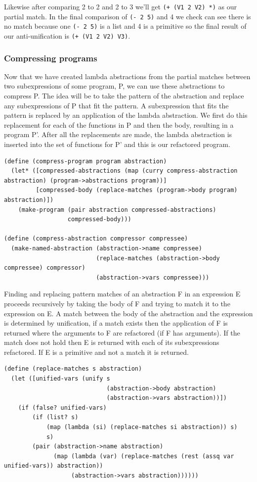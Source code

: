 \documentclass[a4paper,10pt]{article}
\begin{document}
Likewise after comparing 2 to 2 and 2 to 3 we'll get \texttt{(+ (V1 2 V2) *)} as our partial match.
In the final comparison of \texttt{(- 2 5)} and 4 we check can see there is no match because one \texttt{(- 2 5)} is a list and 4 is a primitive so the final result of our anti-unification is \texttt{(+ (V1 2 V2) V3)}.


\subsubsection{Compressing programs}
Now that we have created lambda abstractions from the partial matches between two subexpressions of some program, P, we can use these abstractions to compress P.  The idea will be to take the pattern of the abstraction and replace any subexpressions of P that fit the pattern.  A subexpression that fits the pattern is replaced by an application of the lambda abstraction.  We first do this replacement for each of the functions in P and then the body, resulting in a program P'.  After all the replacements are made, the lambda abstraction is inserted into the set of functions for P' and this is our refactored program.
\begin{lstlisting}[frame=trBL]
(define (compress-program program abstraction)
  (let* ([compressed-abstractions (map (curry compress-abstraction abstraction) (program->abstractions program))]
         [compressed-body (replace-matches (program->body program) abstraction)])
    (make-program (pair abstraction compressed-abstractions)
                  compressed-body)))

(define (compress-abstraction compressor compressee)
  (make-named-abstraction (abstraction->name compressee)
                          (replace-matches (abstraction->body compressee) compressor)
                          (abstraction->vars compressee)))                           
\end{lstlisting}
Finding and replacing pattern matches of an abstraction F in an expression E proceeds recursively by taking the body of F and trying to match it to the expression on E.  A match between the body of the abstraction and the expression is determined by unification, if a match exists then the application of F is returned where the arguments to F are refactored (if F has arguments).  If the match does not hold then E is returned with each of its subexpressions refactored.  If E is a primitive and not a match it is returned.

\begin{lstlisting}[frame=trBL]
(define (replace-matches s abstraction)
  (let ([unified-vars (unify s
                             (abstraction->body abstraction)
                             (abstraction->vars abstraction))])
    (if (false? unified-vars)
        (if (list? s)
            (map (lambda (si) (replace-matches si abstraction)) s)
            s)
        (pair (abstraction->name abstraction)
              (map (lambda (var) (replace-matches (rest (assq var unified-vars)) abstraction))
                   (abstraction->vars abstraction))))))
\end{lstlisting}
\end{document}
